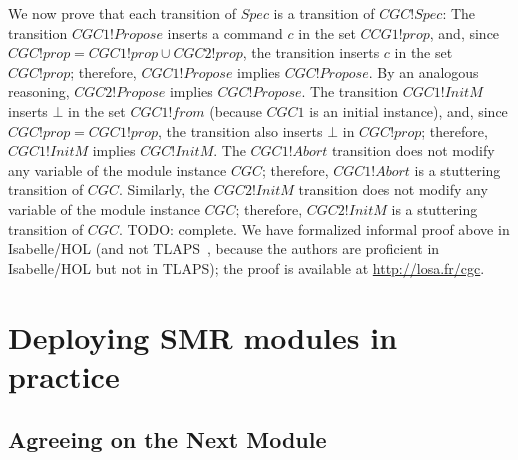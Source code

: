 We now prove that each transition of $Spec$ is a transition of $CGC!Spec$:
The transition $CGC1!Propose$ inserts a command $c$ in the set $CCG1!prop$, and, since $CGC!prop = CGC1!prop \cup CGC2!prop$, the transition inserts $c$ in the set $CGC!prop$; therefore, $CGC1!Propose$ implies $CGC!Propose$.
By an analogous reasoning, $CGC2!Propose$ implies $CGC!Propose$.
The transition $CGC1!InitM$ inserts $\bot$ in the set $CGC1!from$ (because $CGC1$ is an initial instance), and, since $CGC!prop = CGC1!prop$, the transition also inserts $\bot$ in $CGC!prop$; therefore, $CGC1!InitM$ implies $CGC!InitM$.
The $CGC1!Abort$ transition does not modify any variable of the module instance $CGC$; therefore, $CGC1!Abort$ is a stuttering transition of $CGC$.
Similarly, the $CGC2!InitM$ transition does not modify any variable of the module instance $CGC$; therefore, $CGC2!InitM$ is a stuttering transition of $CGC$.
TODO\@: complete.
We have formalized informal proof above in Isabelle/HOL (and not TLAPS~\cite{CousineauETAL12TlaProofs}, because the authors are proficient in Isabelle/HOL but not in TLAPS); the proof is available at \url{http://losa.fr/cgc}.


\section{Deploying SMR modules in practice}

\subsection{Agreeing on the Next Module}
